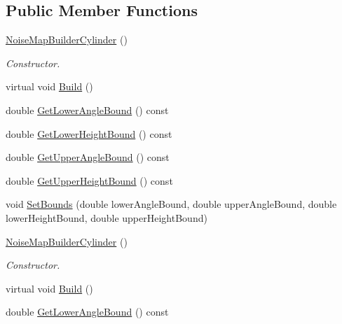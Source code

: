 \subsection*{Public Member Functions}
\begin{DoxyCompactItemize}
\item 
\hyperlink{classnoise_1_1utils_1_1_noise_map_builder_cylinder_a31178dd76e9f62d682f52abdbb51e4b2}{Noise\+Map\+Builder\+Cylinder} ()
\begin{DoxyCompactList}\small\item\em Constructor. \end{DoxyCompactList}\item 
virtual void \hyperlink{classnoise_1_1utils_1_1_noise_map_builder_cylinder_a684d087e172d16c1c754e48c69ac12a0}{Build} ()
\item 
double \hyperlink{classnoise_1_1utils_1_1_noise_map_builder_cylinder_a0635e00f0a9b0e6302576268c0d5e3af}{Get\+Lower\+Angle\+Bound} () const 
\item 
double \hyperlink{classnoise_1_1utils_1_1_noise_map_builder_cylinder_ad2accfd3d9cf4fd851a8bc9ce332816a}{Get\+Lower\+Height\+Bound} () const 
\item 
double \hyperlink{classnoise_1_1utils_1_1_noise_map_builder_cylinder_ac29d2bd03c6d948e4e1ee7c27cbccfeb}{Get\+Upper\+Angle\+Bound} () const 
\item 
double \hyperlink{classnoise_1_1utils_1_1_noise_map_builder_cylinder_a7237ee50f47cdc53400a253595c7ff43}{Get\+Upper\+Height\+Bound} () const 
\item 
void \hyperlink{classnoise_1_1utils_1_1_noise_map_builder_cylinder_ab699795566901fef4c86dbf1db51ae3a}{Set\+Bounds} (double lower\+Angle\+Bound, double upper\+Angle\+Bound, double lower\+Height\+Bound, double upper\+Height\+Bound)
\item 
\hyperlink{classnoise_1_1utils_1_1_noise_map_builder_cylinder_a33ba1fa029084f4e3c9a9d377279f13d}{Noise\+Map\+Builder\+Cylinder} ()
\begin{DoxyCompactList}\small\item\em Constructor. \end{DoxyCompactList}\item 
virtual void \hyperlink{classnoise_1_1utils_1_1_noise_map_builder_cylinder_a0c136038ea3fa328962c437a28269726}{Build} ()
\item 
double \hyperlink{classnoise_1_1utils_1_1_noise_map_builder_cylinder_a0635e00f0a9b0e6302576268c0d5e3af}{Get\+Lower\+Angle\+Bound} () const 
\item 

\end{DoxyCompactItemize}

